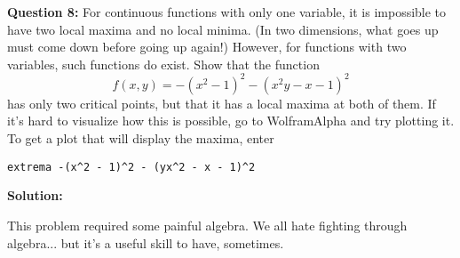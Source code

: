 \documentclass[10pt]{amsart}
\begin{document}
\textbf{Question 8:} For continuous functions with only one variable, it is impossible to have two local maxima and no local minima. (In two dimensions, what goes up must come down before going up again!) However, for functions with two variables, such functions do exist. Show that the function
$$f(x,y) = -(x^2-1)^2 - (x^2y-x-1)^2$$
has only two critical points, but that it has a local maxima at both of them. If it's hard to visualize how this is possible, go to WolframAlpha and try plotting it. To get a plot that will display the maxima, enter 

\begin{center}\verb+extrema -(x^2 - 1)^2 - (yx^2 - x - 1)^2+
\end{center}


\textbf{Solution:}

This problem required some painful algebra. We all hate fighting through algebra... but it's a useful skill to have, sometimes. 
\end{document}
